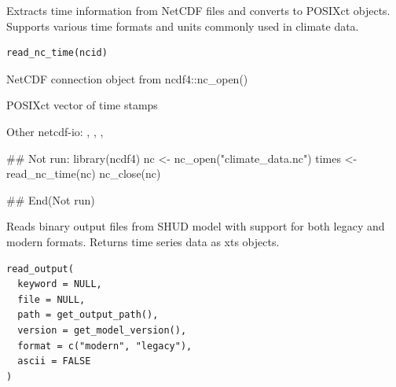 \documentclass[a4paper]{book}
\begin{document}
%
\begin{Description}\relax
Extracts time information from NetCDF files and converts to POSIXct objects.
Supports various time formats and units commonly used in climate data.
\end{Description}
%
\begin{Usage}
\begin{verbatim}
read_nc_time(ncid)
\end{verbatim}
\end{Usage}
%
\begin{Arguments}
\begin{ldescription}
\item[\code{ncid}] NetCDF connection object from ncdf4::nc\_open()
\end{ldescription}
\end{Arguments}
%
\begin{Value}
POSIXct vector of time stamps
\end{Value}
%
\begin{SeeAlso}\relax
Other netcdf-io: 
,
,
,
\end{SeeAlso}
%
\begin{Examples}
\begin{ExampleCode}
## Not run: 
library(ncdf4)
nc <- nc_open("climate_data.nc")
times <- read_nc_time(nc)
nc_close(nc)

## End(Not run)
\end{ExampleCode}
\end{Examples}
%
\begin{Description}\relax
Reads binary output files from SHUD model with support for both legacy
and modern formats. Returns time series data as xts objects.
\end{Description}
%
\begin{Usage}
\begin{verbatim}
read_output(
  keyword = NULL,
  file = NULL,
  path = get_output_path(),
  version = get_model_version(),
  format = c("modern", "legacy"),
  ascii = FALSE
)
\end{verbatim}
\end{Usage}
\end{document}
